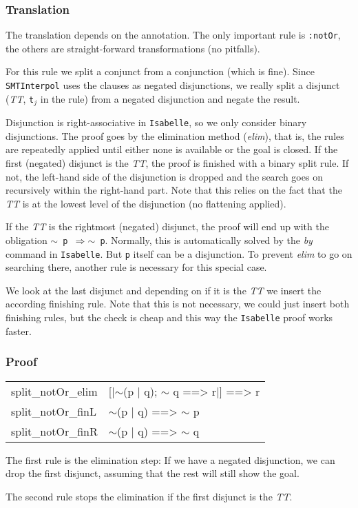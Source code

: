 \documentclass[10pt,a4paper]{article}
\newcommand{\si}{\texttt{SMTInterpol}\xspace}
\newcommand{\isa}{\texttt{Isabelle}\xspace}
\newcommand{\ttt}{\texttt}
\newcommand{\negat}{\ensuremath{\sim}}
\newcommand{\nega}{\negat\xspace}
\newcommand{\metaimp}{\ensuremath{\Longrightarrow}\xspace}
\newcommand{\TTx}{\emph{TT}}
\newcommand{\TT}{\TTx\xspace}
\newenvironment{pt}[1]{\begin{center}\begin{tt}\begin{tabular}{#1}\hline}{\end{tabular}\end{tt}\end{center}}
\newcommand{\pl}[1]{#1 \\[1mm]}
\newcommand{\pll}[1]{#1 \\\hline}
\begin{document}
\subsubsection*{Translation}
The translation depends on the annotation. The only important rule is \ttt{:notOr}, the others are straight-forward transformations (no pitfalls).

For this rule we split a conjunct from a conjunction (which is fine). Since \si uses the clauses as negated disjunctions, we really split a disjunct (\TT, \ttt{t}$_j$ in the rule) from a negated disjunction and negate the result.

Disjunction is right-associative in \isa, so we only consider binary disjunctions. The proof goes by the elimination method (\emph{elim}), that is, the rules are repeatedly applied until either none is available or the goal is closed. If the first (negated) disjunct is the \TT, the proof is finished with a binary split rule. If not, the left-hand side of the disjunction is dropped and the search goes on recursively within the right-hand part. Note that this relies on the fact that the \TT is at the lowest level of the disjunction (no flattening applied).

If the \TT is the rightmost (negated) disjunct, the proof will end up with the obligation \ttt{\nega p \metaimp \nega p}. Normally, this is automatically solved by the \emph{by} command in \isa. But \ttt{p} itself can be a disjunction. To prevent \emph{elim} to go on searching there, another rule is necessary for this special case.

We look at the last disjunct and depending on if it is the \TT we insert the according finishing rule. Note that this is not necessary, we could just insert both finishing rules, but the check is cheap and this way the \isa proof works faster.
%
\subsubsection*{Proof}
\begin{pt}{ll}
	\pl{split\_notOr\_elim & [|\nega (p | q); \nega q ==> r|] ==> r}
	\pl{split\_notOr\_finL & \nega (p | q) ==> \nega p}
	\pll{split\_notOr\_finR & \nega (p | q) ==> \nega q}
\end{pt}
%
The first rule is the elimination step: If we have a negated disjunction, we can drop the first disjunct, assuming that the rest will still show the goal.

The second rule stops the elimination if the first disjunct is the \TT.
\end{document}
